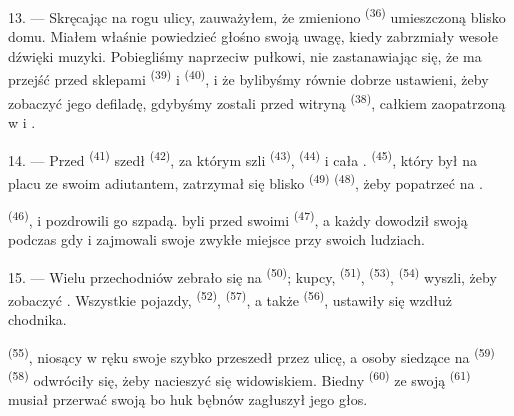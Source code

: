 13. --- Skręcając na rogu ulicy, zauważyłem, że zmieniono 
\textsuperscript{(36)} umieszczoną blisko  domu. Miałem właśnie powiedzieć
głośno swoją uwagę, kiedy zabrzmiały wesołe dźwięki  muzyki.
Pobiegliśmy naprzeciw pułkowi, nie zastanawiając się, że  ma przejść przed
sklepami  \textsuperscript{(39)} i 
\textsuperscript{(40)}, i że bylibyśmy równie dobrze ustawieni, żeby zobaczyć jego
defiladę, gdybyśmy zostali przed witryną  \textsuperscript{(38)},
całkiem zaopatrzoną w  i .

\VUsaut{3.0mm}

14. --- Przed  \textsuperscript{(41)} szedł 
\textsuperscript{(42)}, za którym szli  \textsuperscript{(43)},
 \textsuperscript{(44)} i cała .
 \textsuperscript{(45)}, który był na placu ze swoim adiutantem,
zatrzymał się blisko  \textsuperscript{(49)} 
\textsuperscript{(48)}, żeby popatrzeć na .

 \textsuperscript{(46)},  i
 pozdrowili go szpadą.  byli przed swoimi
 \textsuperscript{(47)}, a każdy  dowodził swoją
 podczas gdy   i
 zajmowali swoje zwykłe miejsce przy swoich ludziach.

15. --- Wielu przechodniów zebrało się na  \textsuperscript{(50)};
kupcy,  \textsuperscript{(51)}, 
\textsuperscript{(53)},  \textsuperscript{(54)} wyszli, żeby zobaczyć
. Wszystkie pojazdy,  \textsuperscript{(52)},
 \textsuperscript{(57)}, a także 
\textsuperscript{(56)}, ustawiły się wzdłuż chodnika.

\VUsaut{3.0mm}

 \textsuperscript{(55)}, niosący w ręku swoje  szybko przeszedł przez ulicę, a osoby siedzące na 
\textsuperscript{(59)}  \textsuperscript{(58)} odwróciły się, żeby
nacieszyć się widowiskiem. Biedny  \textsuperscript{(60)} ze
swoją  \textsuperscript{(61)} musiał przerwać swoją
 bo huk bębnów zagłuszył jego głos.

